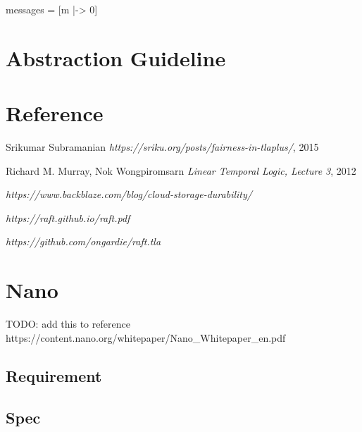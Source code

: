 \documentclass{report}
\begin{document}
\begin{tla}
messages = [m \in {} |-> 0]
\end{tla}
\begin{tlatex}
%
\end{tlatex}






\chapter{Abstraction Guideline}

\chapter{Reference}

\begin{thebibliography}{9}

\bibitem{}
Srikumar Subramanian
\textit{https://sriku.org/posts/fairness-in-tlaplus/}, 2015

\bibitem{}
Richard M. Murray, Nok Wongpiromsarn
\textit{Linear Temporal Logic, Lecture 3}, 2012

\textit{https://www.backblaze.com/blog/cloud-storage-durability/}

\textit{https://raft.github.io/raft.pdf}

\textit{https://github.com/ongardie/raft.tla}

\end{thebibliography}

\chapter{Nano}

TODO: add this to reference\newline
https://content.nano.org/whitepaper/Nano\_Whitepaper\_en.pdf

\section{Requirement}

\section{Spec}
\end{document}
